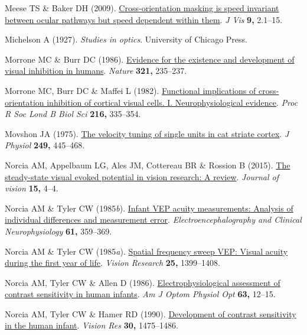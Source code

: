 \documentclass[
  letterpaper,
  DIV=11,
  numbers=noendperiod]{scrartcl}
\newlength{\cslhangindent}
\newenvironment{CSLReferences}[2] %
 {\begin{list}{}{%
  \setlength{\itemindent}{0pt}
  \setlength{\leftmargin}{0pt}
  \setlength{\parsep}{0pt}
  \ifodd #1
   \setlength{\leftmargin}{\cslhangindent}
   \setlength{\itemindent}{-1\cslhangindent}
  \fi
  \setlength{\itemsep}{#2\baselineskip}}}
 {\end{list}}
\begin{document}
\begin{CSLReferences}{1}{1}
Meese TS \& Baker DH (2009).
\href{https://doi.org/10.1167/9.5.2}{Cross-orientation masking is speed
invariant between ocular pathways but speed dependent within them}.
\emph{J Vis} \textbf{9,} 2.1--15.

Michelson A (1927). \emph{Studies in optics}. University of Chicago
Press.

Morrone MC \& Burr DC (1986).
\href{https://doi.org/10.1038/321235a0}{Evidence for the existence and
development of visual inhibition in humans}. \emph{Nature} \textbf{321,}
235--237.

Morrone MC, Burr DC \& Maffei L (1982).
\href{https://doi.org/10.1098/rspb.1982.0078}{Functional implications of
cross-orientation inhibition of cortical visual cells. I.
Neurophysiological evidence}. \emph{Proc R Soc Lond B Biol Sci}
\textbf{216,} 335--354.

Movshon JA (1975).
\href{https://doi.org/10.1113/jphysiol.1975.sp011025}{The velocity
tuning of single units in cat striate cortex}. \emph{J Physiol}
\textbf{249,} 445--468.

Norcia AM, Appelbaum LG, Ales JM, Cottereau BR \& Rossion B (2015).
\href{https://doi.org/10.1167/15.6.4}{The steady-state visual evoked
potential in vision research: {A} review}. \emph{Journal of vision}
\textbf{15,} 4--4.

Norcia AM \& Tyler CW (1985\emph{b}).
\href{https://doi.org/10.1016/0013-4694(85)91026-0}{Infant {VEP} acuity
measurements: Analysis of individual differences and measurement error}.
\emph{Electroencephalography and Clinical Neurophysiology} \textbf{61,}
359--369.

Norcia AM \& Tyler CW (1985\emph{a}).
\href{https://doi.org/10.1016/0042-6989(85)90217-2}{Spatial frequency
sweep {VEP}: Visual acuity during the first year of life}. \emph{Vision
Research} \textbf{25,} 1399--1408.

Norcia AM, Tyler CW \& Allen D (1986).
\href{https://doi.org/10.1097/00006324-198601000-00003}{Electrophysiological
assessment of contrast sensitivity in human infants}. \emph{Am J Optom
Physiol Opt} \textbf{63,} 12--15.

Norcia AM, Tyler CW \& Hamer RD (1990).
\href{https://doi.org/10.1016/0042-6989(90)90028-j}{Development of
contrast sensitivity in the human infant}. \emph{Vision Res}
\textbf{30,} 1475--1486.


\end{CSLReferences}
\end{document}

